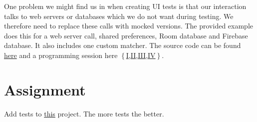 One problem we might find us in when creating UI tests is that our interaction talks to web servers or databases which we do not want during testing. We therefore need to replace these calls with mocked versions. The provided example does this for a web server call, shared preferences, Room database and Firebase database. It also includes one custom matcher. The source code can be found \href{https://github.com/JonSteinn/AndroidDevelopment/tree/master/examples/lab6/espressotest}{here} and a programming session here $\left\{\right.$\href{https://www.youtube.com/watch?v=RW19LV9FG7w}{I},\href{https://www.youtube.com/watch?v=pxdfimd4MDc}{II},\href{TODO}{III},\href{TODO}{IV}$\left.\right\}$.


\section{Assignment}
Add tests to \href{https://github.com/JonSteinn/AndroidDevelopment/raw/master/examples/lab6/test_template.zip}{this} project. The more tests the better.

